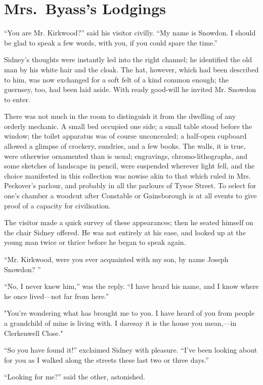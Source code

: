 \chapter{Mrs.\ Byass's Lodgings}

``You are Mr. Kirkwood?'' said his visitor civilly. ``My name is
Snowdon. I should be glad to speak a few words, with you, if you could
spare the time.''

Sidney's thoughts were instantly led into the right channel; he
identified the old man by his white hair and the cloak. The hat,
however, which had been described to him, was now exchanged for a soft
felt of a kind common enough; the guernsey, too, had been laid aside.
With ready good-will he invited Mr. Snowdon to enter.

There was not much in the room to distinguish it from the dwelling of
any orderly mechanic. A small bed occupied one side; a small table stood
before the window; the toilet apparatus was of course unconcealed; {}a
half-open cupboard allowed a glimpse of crockery, sundries, and a few
books. The walls, it is true, were otherwise ornamented than is usual;
engravings, chromo-lithographs, and some sketches of landscape in
pencil, were suspended wherever light fell, and the choice manifested in
this collection was nowise akin to that which ruled in Mrs. Peckover's
parlour, and probably in all the parlours of Tysoe Street. To select for
one's chamber a woodcut after Constable or Gainsborough is at all events
to give proof of a capacity for civilisation.

The visitor made a quick survey of these appearances; then he seated
himself on the chair Sidney offered. He was not entirely at his ease,
and looked up at the young man twice or thrice before he began to speak
again.

``Mr. Kirkwood, were you ever acquainted with my son, by name Joseph
Snowdon? ''

``No, I never knew him,'' was the reply. ``I have heard his name, and I
know where he once lived---not far from here.''

"You're wondering what has brought me {}to you. I have heard of you from
people a grandchild of mine is living with. I daresay it is the house
you mean,---in Clerkenwell Close."

``So you have found it!'' exclaimed Sidney with pleasure. ``I've been
looking about for you as I walked along the streets these last two or
three days.''

``Looking for me?'' said the other, astonished.

